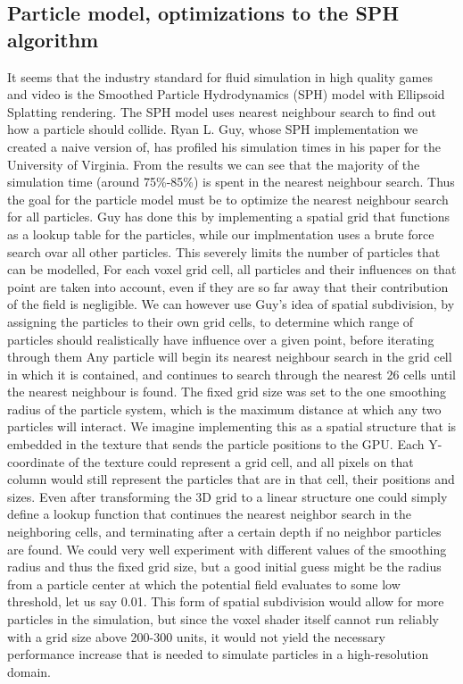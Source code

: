 \documentclass{article}
\begin{document}
\begin{multicols}{2}
        \subsection{Particle model, optimizations to the SPH algorithm}
        It seems that the industry standard for fluid simulation in high quality games and video is the Smoothed Particle Hydrodynamics (SPH) model with Ellipsoid Splatting rendering.
        The SPH model uses nearest neighbour search to find out how a particle should collide.
        Ryan L. Guy, whose SPH implementation we created a naive version of, has profiled his simulation times in his paper for the University of Virginia. From the results we can see that the majority of the simulation time (around 75\%-85\%) is spent in the nearest neighbour search.
        Thus the goal for the particle model must be to optimize the nearest neighbour search for all particles.
        \cite{guy15}
        Guy has done this by implementing a spatial grid that functions as a lookup table for the particles, while our implmentation uses a brute force search ovar all other particles.
        This severely limits the number of particles that can be modelled, 
        For each voxel grid cell, all particles and their influences on that point are taken into account, even if they are so far away that their contribution of the field is negligible.
        We can however use Guy's idea of spatial subdivision, by assigning the particles to their own grid cells, to determine which range of particles should realistically have influence over a given point, before iterating through them 
        Any particle will begin its nearest neighbour search in the grid cell in which it is contained, and continues to search through the nearest 26 cells until the nearest neighbour is found.
        The fixed grid size was set to the one smoothing radius of the particle system, which is the maximum distance at which any two particles will interact.
        We imagine implementing this as a spatial structure that is embedded in the texture that sends the particle positions to the GPU.
        Each Y-coordinate of the texture could represent a grid cell, and all pixels on that column would still represent the particles that are in that cell, their positions and sizes.
        Even after transforming the 3D grid to a linear structure one could simply define a lookup function that continues the nearest neighbor search in the neighboring cells, and terminating after a certain depth if no neighbor particles are found.
        We could very well experiment with different values of the smoothing radius and thus the fixed grid size, but a good initial guess might be the radius from a particle center at which the potential field evaluates to some low threshold, let us say 0.01. 
        This form of spatial subdivision would allow for more particles in the simulation, but since the voxel shader itself cannot run reliably with a grid size above 200-300 units, it would not yield the necessary performance increase that is needed to simulate particles in a high-resolution domain.


\end{multicols}
\end{document}
